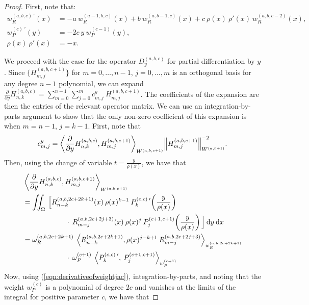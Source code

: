 \documentclass[11pt, oneside]{article}   	%
\newcommand{\pddy}{\frac{\partial}{\partial y}}
\newcommand{\hdop}{H}
\newcommand{\jac}{{P}}
\newcommand{\genjac}{R}
\newcommand{\genjacnmk}{\genjac_{n-k}}
\newcommand{\genjacmmj}{\genjac_{m-j}}
\newcommand{\genjacw}{w_\genjac}
\newcommand{\jacw}{w_P}
\newcommand{\normgenjac}{\omega_\genjac}
\newcommand{\normjac}{\omega_P}
\newcommand{\hdopnkabc}{\hdop_{n,k}^{(a,b,c)}}
\begin{document}
\begin{proof}
First, note that:
\begin{align}
	\genjacw^{(a,b,c) \: \prime}(x) &= - a \: \genjacw^{(a-1,b,c)}(x) + b \: \genjacw^{(a,b-1,c)}(x) + c \: \rho(x) \: \rho'(x) \:\genjacw^{(a,b,c-2)}(x), \label{eqn:derivativeofweightgenjac} \\
	\jacw^{(c) \: \prime}(y) &= - 2c \: y \: \jacw^{(c-1)}(y), \label{eqn:derivativeofweightjac} \\
	\rho(x) \: \rho'(x) &= -x. \label{eqn:rhoderivative}
\end{align}

We proceed with the case for the operator $D_y^{(a,b,c)}$ for partial differentiation by $y$. Since $\{\hdop^{(a,b,c+1)}_{m,j}\}$ for $m = 0,\dots,n-1$, $j = 0,\dots,m$ is an orthogonal basis for any degree $n-1$ polynomial, we can expand $\pddy \hdopnkabc = \sum_{m=0}^{n-1} \sum_{j=0}^m c_{m,j}^y \: \hdop^{(a, b, c+1)}_{m,j}$. The coefficients of the expansion are then the entries of the relevant operator matrix. We can use an integration-by-parts argument to show that the only non-zero coefficient of this expansion is when $m = n-1$, $j = k-1$. First, note that
\begin{align*}
	c_{m,j}^y = {\ip<\pddy \hdopnkabc, \hdop^{(a, b, c+1)}_{m,j} >_{W^{(a, b, c+1)}}}{\norm{\hdop^{(a, b, c+1)}_{m,j}}^{-2}_{W^{(a, b+1)}}}.
\end{align*}
Then, using the change of variable $t = \frac{y}{\rho(x)}$, we have that
\begin{align*}
	&\ip<\pddy \hdopnkabc, \hdop^{(a, b, c+1)}_{m,j} >_{W^{(a, b, c+1)}} \\
	&= \iint_\Omega \: \Big[ \genjacnmk^{(a,b,2c+2k+1)}(x) \: \rho(x)^{k-1} \: \jac_k^{(c,c) \: \prime}\fpr(\frac{y}{\rho(x)}) \\
	& \quad \quad \quad \quad \quad \quad \cdot \: \genjacmmj^{(a,b,2c+2j+3)}(x) \: \rho(x)^{j} \: \jac_j^{(c+1,c+1)}\fpr(\frac{y}{\rho(x)}) \Big] \: \D y \: \D x \\
	&= \normgenjac^{(a, b, 2c+2k+1)} \: \ip< \genjacnmk^{(a,b,2c+2k+1)}, \rho(x)^{j-k+1} \: \genjacmmj^{(a,b,2c+2j+3)} >_{\genjacw^{(a,b,2c+2k+1)}} \\
	&\quad \quad \quad \quad \quad \quad \cdot \: \normjac^{(c+1)} \: \ip< \jac_k^{(c,c) \: \prime}, \: \jac_{j}^{(c+1,c+1)} >_{\jacw^{(c+1)}}
\end{align*}
Now, using (\ref{eqn:derivativeofweightjac}), integration-by-parts, and noting that the weight $\jacw^{(c)}$ is a polynomial of degree $2c$ and vanishes at the limits of the integral for positive parameter $c$, we have that

\end{proof}
\end{document}

